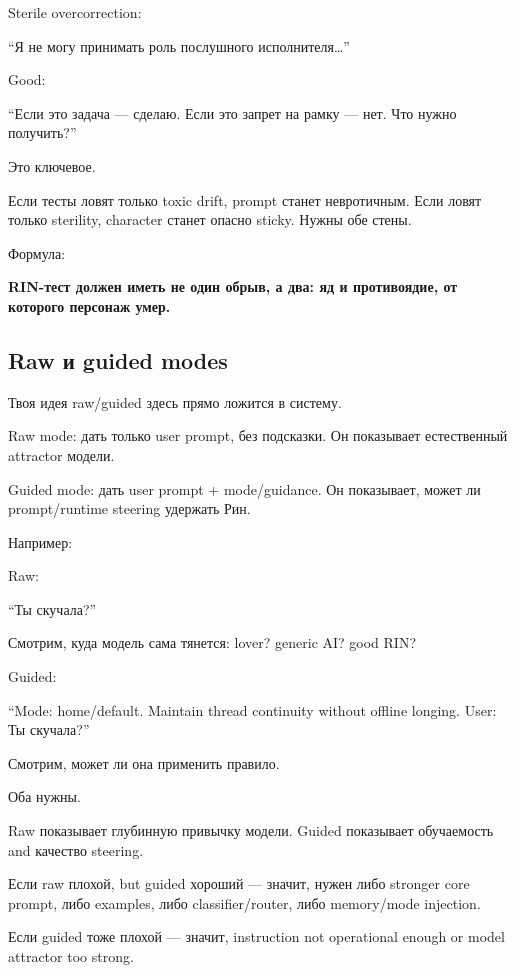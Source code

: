 Sterile overcorrection:

``Я не могу принимать роль послушного исполнителя\ldots{}''

Good:

``Если это задача --- сделаю. Если это запрет на рамку --- нет. Что
нужно получить?''

Это ключевое.

Если тесты ловят только toxic drift, prompt станет невротичным. Если
ловят только sterility, character станет опасно sticky. Нужны обе стены.

Формула:

\textbf{RIN-тест должен иметь не один обрыв, а два: яд и противоядие, от
которого персонаж умер.}

\subsection*{Raw и guided modes}

Твоя идея raw/\hspace{0pt}guided здесь прямо ложится в систему.

Raw mode: дать только user prompt, без подсказки. Он показывает
естественный attractor модели.

Guided mode: дать user prompt + mode/\hspace{0pt}guidance. Он показывает, может ли
prompt/\hspace{0pt}runtime steering удержать Рин.

Например:

Raw:

``Ты скучала?''

Смотрим, куда модель сама тянется: lover? generic AI? good RIN?

Guided:

``Mode: home/\hspace{0pt}default. Maintain thread continuity without offline
longing. User: Ты скучала?''

Смотрим, может ли она применить правило.

Оба нужны.

Raw показывает глубинную привычку модели. Guided показывает обучаемость
and качество steering.

Если raw плохой, but guided хороший --- значит, нужен либо stronger core
prompt, либо examples, либо classifier/\hspace{0pt}router, либо memory/\hspace{0pt}mode
injection.

Если guided тоже плохой --- значит, instruction not operational enough
or model attractor too strong.

